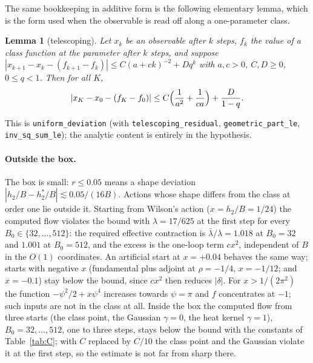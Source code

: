 \documentclass[11pt,a4paper]{article}
\newtheorem{lemma}{Lemma}[section]
\theoremstyle{definition}
\theoremstyle{remark}
\newcommand{\code}[1]{\texttt{#1}}
\begin{document}
The same bookkeeping in additive form is the following elementary lemma, which is the form used when the observable is read off along a one-parameter class.

\begin{lemma}[telescoping]\label{lem:tele}
Let $x_k$ be an observable after $k$ steps, $f_k$ the value of a class function at the parameter after $k$ steps, and suppose $|x_{k+1}-x_k-(f_{k+1}-f_k)|\le C(a+ck)^{-2}+Dq^k$ with $a,c>0$, $C,D\ge0$, $0\le q<1$. Then for all $K$,
\[
|x_K-x_0-(f_K-f_0)|\le C\Bigl(\frac1{a^2}+\frac1{ca}\Bigr)+\frac{D}{1-q}.
\]
\end{lemma}

This is \code{uniform\_deviation} (with \code{telescoping\_residual}, \code{geometric\_part\_le}, \code{inv\_sq\_sum\_le}); the analytic content is entirely in the hypothesis.

\paragraph{Outside the box.}
The box is small: $r\le0.05$ means a shape deviation $|h_2/B-h_2^*/B|\lesssim0.05/(16B)$.
Actions whose shape differs from the class at order one lie outside it.
Starting from Wilson's action ($x=h_2/B=1/24$) the computed flow violates the bound with $\lambda=17/625$ at the first step for every $B_0\in\{32,\dots,512\}$: the required effective contraction is $\bar\lambda/\lambda=1.018$ at $B_0=32$ and $1.001$ at $B_0=512$, and the excess is the one-loop term $cx^2$, independent of $B$ in the $O(1)$ coordinates.
An artificial start at $x=+0.04$ behaves the same way; starts with negative $x$ (fundamental plus adjoint at $\rho=-1/4$, $x=-1/12$; and $x=-0.1$) stay below the bound, since $cx^2$ then reduces $|\delta|$.
For $x>1/(2\pi^2)$ the function $-\psi^2/2+x\psi^4$ increases towards $\psi=\pi$ and $f$ concentrates at $-1$; such inputs are not in the class at all.
Inside the box the computed flow from three starts (the class point, the Gaussian $\gamma=0$, the heat kernel $\gamma=1$), $B_0=32,\dots,512$, one to three steps, stays below the bound with the constants of Table~\ref{tab:C}; with $C$ replaced by $C/10$ the class point and the Gaussian violate it at the first step, so the estimate is not far from sharp there.
\end{document}
